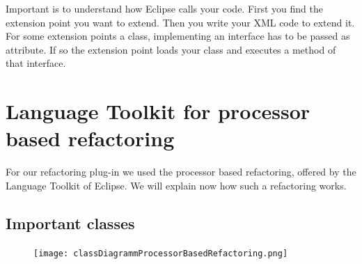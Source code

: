 \documentclass[a4paper,10pt]{report}
\begin{document}
Important is to understand how Eclipse calls your code. First you find the extension point you want to extend. Then you write your XML code to extend it. For some extension points a class, implementing an interface has to be passed as attribute. If so the extension point loads your class and executes a method of that interface.


\chapter{Language Toolkit for processor based refactoring}
\label{languageToolkitForProcessorBasedRefactoring}
For our refactoring plug-in we used the processor based refactoring, offered by the Language Toolkit of Eclipse. We will explain now how such a refactoring works.
\section{Important classes}

\begin{figure}[h]
\centering
\texttt{[image: classDiagrammProcessorBasedRefactoring.png]}
\end{figure}
\end{document}

